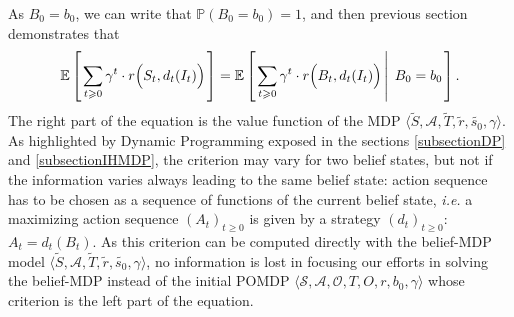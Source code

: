 As $B_0 = b_0$, we can write that $\mathbb{P}(B_0 = b_0) = 1$, and then previous section demonstrates that 
\[ \mathbb{E} \left[ \left.  \sum_{ t \geqslant 0} \gamma^t \cdot r\Big(S_t,d_t(I_t)\Big)  \right. \right] = \mathbb{E} \left[ \left.  \sum_{ t \geqslant 0} \gamma^t \cdot  r\Big(B_t,d_t(I_t)\Big) \, \right| \left. \, B_0 = b_0  \right. \right]. \]
The right part of the equation is the value function of the MDP $\langle \tilde{S}, \mathcal{A}, \tilde{T}, \tilde{r}, \tilde{s_0}, \gamma  \rangle$.
As highlighted by Dynamic Programming exposed in the sections \ref{subsectionDP} and \ref{subsectionIHMDP}, 
the criterion may vary for two belief states, 
but not if the information varies 
always leading to the same belief state:
action sequence has to be chosen as a sequence of functions of the current belief state,
\textit{i.e.} a maximizing action sequence $(A_t)_{t \geqslant 0}$ 
is given by a strategy $(d_t)_{t \geqslant 0}$: $A_t = d_t(B_t)$.
As this criterion can be computed directly with the belief-MDP model 
$\langle \tilde{S}, \mathcal{A}, \tilde{T}, \tilde{r}, \tilde{s_0}, \gamma  \rangle$,
no information is lost in focusing our efforts in solving 
the belief-MDP instead of the initial POMDP $\langle \mathcal{S}, \mathcal{A}, \mathcal{O}, T, O, r, b_0, \gamma \rangle$
whose criterion is the left part of the equation. 

